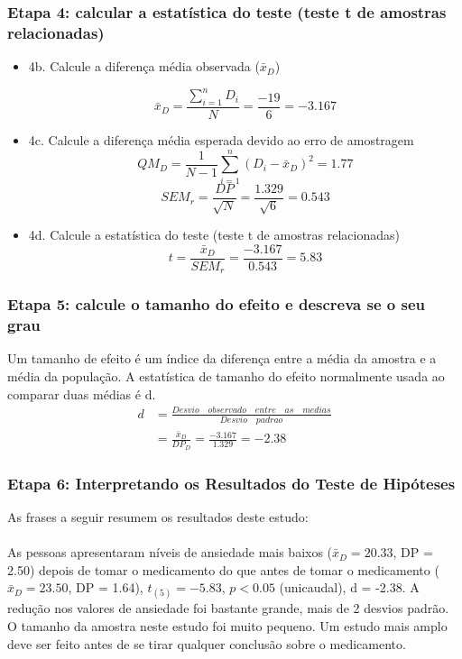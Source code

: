 \documentclass[11pt]{beamer}
\begin{document}
\begin{frame}
\frametitle{Etapa 4: calcular a estatística do teste (teste t de amostras relacionadas)}
\begin{itemize}
\item 4b. Calcule a diferença média observada ($\bar{x}_D$)

\[\bar{x}_D = \frac{\sum_{i=1}^n D_i}{N} = \frac{-19}{6} = -3.167\]

\item 4c. Calcule a diferença média esperada devido ao erro de amostragem
\[QM_D = \frac{1}{N-1}\sum_{i=1}^n(D_i - \bar{x}_D)^2 = 1.77\]
\[SEM_r = \frac{DP}{\sqrt{N}} = \frac{1.329}{\sqrt{6}} = 0.543\]
\item 4d. Calcule a estatística do teste (teste t de amostras relacionadas)
\[t =  \frac{\bar{x}_D}{SEM_r}  = \frac{-3.167}{0.543} = 5.83\]
\end{itemize}
\end{frame}

\begin{frame}
\frametitle{Etapa 5: calcule o tamanho do efeito e descreva se o seu grau}
Um tamanho de efeito é um índice da diferença entre a média da amostra e a média da população. A estatística de tamanho do efeito normalmente usada ao comparar duas médias é d. 
\begin{align*}
d &= \frac{Desvio\quad observado\quad entre\quad as\quad medias}{Desvio\quad padrao}\\
  &= \frac{\bar{x}_D}{DP_D} = \frac{-3.167}{1.329} =  -2.38
\end{align*}

\end{frame}


\begin{frame}
\frametitle{Etapa 6: Interpretando os Resultados do Teste de Hipóteses}

As frases a seguir resumem os resultados deste estudo:\\~\\

As pessoas apresentaram níveis de ansiedade mais baixos (\(\bar{x}_D = 20.33\), DP = 2.50) depois de tomar o medicamento do que antes de tomar o medicamento (\(\bar{x}_D = 23.50\), DP = 1.64), \(t_{(5)} = -5.83\), \(p < 0.05\) (unicaudal), d = -2.38. A redução nos valores de ansiedade foi bastante grande, mais de 2 desvios padrão. O tamanho da amostra neste estudo foi muito pequeno. Um estudo mais amplo deve ser feito antes de se tirar qualquer conclusão sobre o medicamento.

\end{frame}
\end{document}
